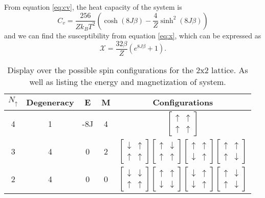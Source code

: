 \documentclass[%
reprint,
nofootinbib,
amsmath,amssymb,
aps,
]{revtex4-1}
\begin{document}
From equation \eqref{eq:cv}, the heat capacity of the system is 
\begin{equation}
	C_v = \frac{256}{Zk_BT^2}\left( \cosh(8J\beta) - \frac{4}{Z}\sinh^2(8J\beta)\right)
\end{equation}
and we can find the susceptibility from equation \eqref{eq:x}, which can be expressed as 
\begin{equation}
	\mathcal{X} = \frac{32\beta}{Z}\left(e^{8J\beta} +1\right).
\end{equation}
\begin{table}
	\caption{Display over the possible spin configurations for the 2x2 lattice. As well as listing the energy and magnetization of system.}
	\label{tab:2x2}
\begin{tabular}{|c|c|c|c|c|}
	\hline 
	$N_\uparrow$ & Degeneracy & E  & M & Configurations\\
	\hline
	4 & 1 & -8J & 4 & $\begin{bmatrix}\uparrow & \uparrow \\ \uparrow&\uparrow\end{bmatrix}$\\
	3 & 4 & 0 & 2 & $\begin{bmatrix}\downarrow & \uparrow \\ \uparrow&\uparrow\end{bmatrix}\begin{bmatrix}\uparrow & \downarrow \\ \uparrow&\uparrow\end{bmatrix}\begin{bmatrix}\uparrow & \uparrow \\ \downarrow&\uparrow\end{bmatrix}\begin{bmatrix}\uparrow & \uparrow \\ \uparrow&\downarrow\end{bmatrix}$\\
	2 & 4 & 0 & 0 &$\begin{bmatrix}\downarrow & \downarrow \\ \uparrow&\uparrow\end{bmatrix}\begin{bmatrix}\uparrow & \uparrow \\ \downarrow&\downarrow\end{bmatrix}\begin{bmatrix}\downarrow & \uparrow \\ \downarrow&\uparrow\end{bmatrix}\begin{bmatrix}\uparrow & \downarrow \\ \uparrow&\downarrow\end{bmatrix}$\\

\end{tabular}
\end{table}
\end{document}
